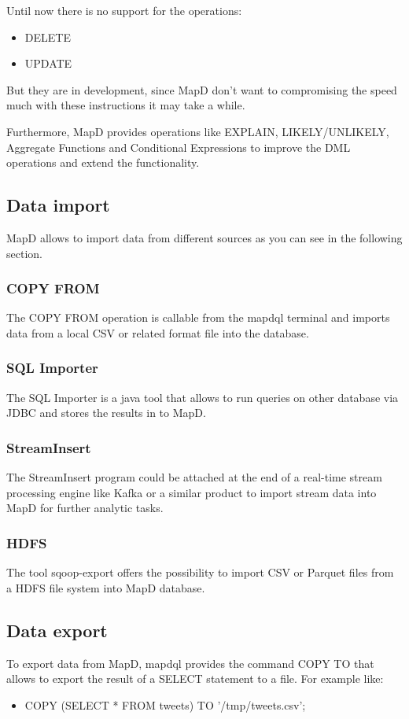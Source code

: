 Until now there is no support for the operations:
\begin{itemize}
 \item DELETE
 \item UPDATE
\end{itemize}
But they are in development, since MapD don't want to compromising the speed much with these instructions it may take a while.

Furthermore, MapD provides operations like EXPLAIN, LIKELY/UNLIKELY, Aggregate Functions and Conditional Expressions to improve the DML operations and extend the functionality.

\subsection{Data import}
MapD allows to import data from different sources as you can see in the following section.

\subsubsection{COPY FROM}
The COPY FROM operation is callable from the mapdql terminal and imports data from a local CSV or related format file into the database.

\subsubsection{SQL Importer}
The SQL Importer is a java tool that allows to run queries on other database via JDBC and stores the results in to MapD.

\subsubsection{StreamInsert}
The StreamInsert program could be attached at the end of a real-time stream processing engine like Kafka or a similar product to import stream data into MapD for further analytic tasks.

\subsubsection{HDFS}
The tool sqoop-export offers the possibility to import CSV or Parquet files from a HDFS file system into MapD database.

\subsection{Data export}
To export data from MapD, mapdql provides the command COPY TO that allows to export the result of a SELECT statement to a file.
For example like:
\begin{itemize}
 \item COPY (SELECT * FROM tweets) TO '/tmp/tweets.csv';
\end{itemize}


